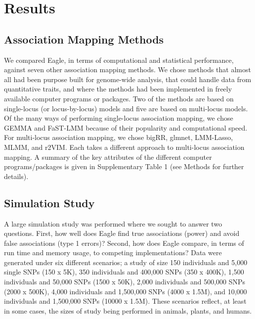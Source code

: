 \documentclass{bioinfo}
\begin{document}
  
  

\section{Results}

\subsection{Association Mapping Methods}

We compared Eagle, in terms of computational and statistical performance, against seven other association mapping methods. 
We chose methods that almost all had been purpose built for genome-wide analysis, that could handle data from quantitative traits, and where the methods had been implemented in freely available computer programs or packages. Two of the methods are based on single-locus (or locus-by-locus) models and five are based on multi-locus models. Of the many ways of performing single-locus association mapping, we chose 
GEMMA and FaST-LMM  because of their popularity and computational speed. 
For multi-locus association mapping, we chose bigRR, glmnet, 
LMM-Lasso, MLMM, and r2VIM.  
Each takes a different approach to multi-locus association mapping. A summary of the key attributes of the different computer programs/packages 
is given in Supplementary Table 1 (see Methods for further details). 

 

\subsection{Simulation Study}

A large simulation study was performed where we sought to  answer two questions. 
First, how well does Eagle find true associations (power) and avoid 
false associations (type 1 errors)? Second, how does Eagle compare, in terms of run time and memory usage, to 
competing implementations? Data were generated under six different scenarios; a study of size 150 individuals 
and 5,000 single SNPs (150 x 5K),  350 individuals and 400,000 SNPs (350 x 400K),  1,500 individuals and 
50,000 SNPs (1500 x 50K), 2,000 individuals and 500,000 SNPs (2000 x 500K), 4,000 individuals and 
1,500,000 SNPs (4000 x 1.5M), and 10,000 individuals and 1,500,000 SNPs (10000 x 1.5M).   
These scenarios reflect, at least in some cases, the sizes of study being performed in animals, plants, and humans.  
\end{document}

